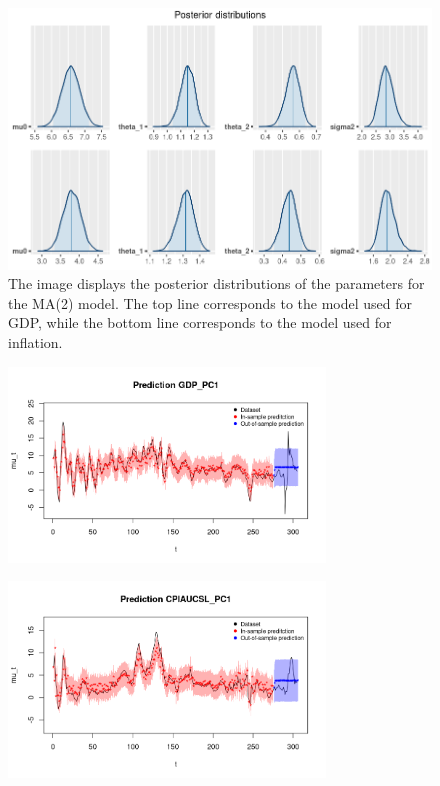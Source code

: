 \begin{figure}[h]
    \centering
    \includegraphics[width=\textwidth]{images/3-MA/posteriors2.png}
    \caption{The image displays the posterior distributions of the parameters for the MA(2) model. The top line corresponds to the model used for GDP, while the bottom line corresponds to the model used for inflation.}
    \label{fig:MA2_posteriors}
\end{figure}

\begin{figure}[h]
    \centering
    \includegraphics[width=0.75\textwidth]{images/3-MA/gdp_prediction2.png}
    \label{fig:MA2_first}
\end{figure}
\begin{figure}[h]
    \centering
    \includegraphics[width=0.75\textwidth]{images/3-MA/infl_prediction2.png}
    \label{fig:MA2_second}
\end{figure}